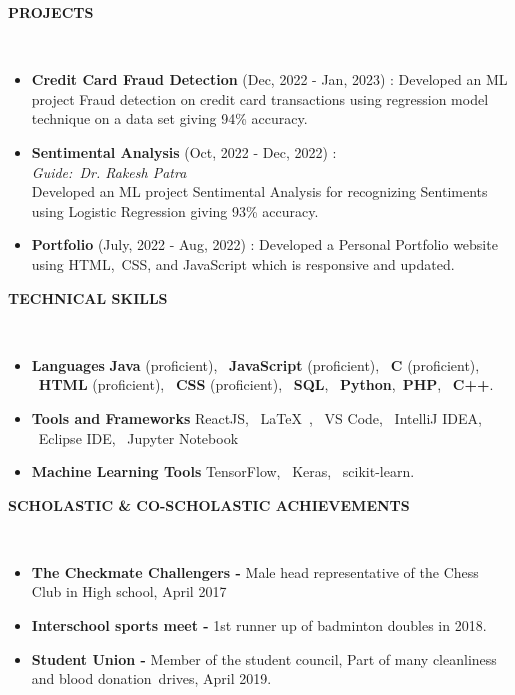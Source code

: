 \documentclass[a4paper,10pt]{article}
\newcommand{\lsep}{-0.5cm}
\newcommand{\resheading}[1]{{\small \colorbox{mygrey}{\begin{minipage}{0.975\textwidth}{\textbf{#1 \vphantom{p\^{E}}}}\end{minipage}}}}
\begin{document}
\resheading{\textbf{PROJECTS} }\\[\lsep]
\begin{itemize}
\setlength\itemsep{0.5em}
\item \textbf{Credit Card Fraud Detection} (Dec, 2022 - Jan, 2023) : Developed an ML project Fraud detection on credit card transactions using regression model technique on a data set giving 94\% accuracy.

\item \textbf{Sentimental Analysis} (Oct, 2022 - Dec, 2022) : \\
\textit{Guide:\ Dr. Rakesh Patra}\\
Developed an ML project Sentimental Analysis for recognizing
Sentiments using Logistic Regression giving 93\% accuracy.
\item \textbf{Portfolio} (July, 2022 - Aug, 2022) : Developed a Personal Portfolio website using HTML,\ CSS, and JavaScript
which is responsive and updated.
\end{itemize}

\resheading{\textbf{TECHNICAL SKILLS} }\\[\lsep]
\begin{itemize}
\setlength\itemsep{0em}
\item \noindent \textbf{Languages} \textbf{Java} (proficient), \ \textbf{JavaScript} (proficient), \ \textbf{C} (proficient), \ \textbf{HTML} (proficient), \ \textbf{CSS} (proficient), \ \textbf{SQL}, \ \textbf{Python},\ \textbf{PHP}, \ \textbf{C++}.
 \item \noindent\textbf{Tools and Frameworks} ReactJS, \  \LaTeX\ , \ VS Code, \ IntelliJ IDEA, \ Eclipse IDE, \ Jupyter Notebook
\item \noindent \textbf{Machine Learning Tools} TensorFlow, \ Keras, \ scikit-learn.
\end{itemize}

\resheading{\textbf{SCHOLASTIC \& CO-SCHOLASTIC ACHIEVEMENTS} }\\[\lsep]
\begin{itemize}
\setlength\itemsep{0em}
\item \noindent \textbf{The Checkmate Challengers - }Male head representative of the Chess Club in High school, April 2017
\item \noindent\textbf{Interschool sports meet - }1st runner up of badminton doubles in 2018.
\item \noindent\textbf{Student Union - }Member of the student council, Part of many cleanliness and blood donation drives, April 2019.

\end{itemize}
\end{document}
